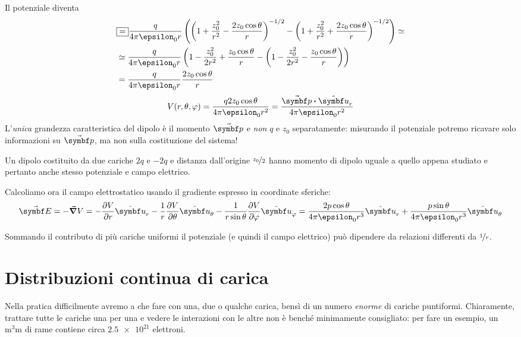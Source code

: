 Il potenziale diventa
\begin{align*}
	&\squarequal\frac{q}{4\pi\epsilon_0r}\left(\left(1+\frac{z_0^2}{r^2}-\frac{2z_0\cos\theta}{r}\right)^{-1/2}-\left(1+\frac{z_0^2}{r^2}+\frac{2z_0\cos\theta}{r}\right)^{-1/2}\right)\simeq\\
	&\simeq\frac{q}{4\pi\epsilon_0r}\left(1-\frac{z_0^2}{2r^2}+\frac{z_0\cos\theta}{r}-\left(1-\frac{z_0^2}{2r^2}-\frac{z_0\cos\theta}{r}\right)\right)\\
	&=\frac{q}{4\pi\epsilon_0r}\frac{2z_0\cos\theta}{r}
\end{align*}
\begin{equation}
	V(r,\theta,\phi)=\frac{q2z_0\cos\theta}{4\pi\epsilon_0r^2}=\frac{\vba{p}\vdot\vbh{u}_r}{4\pi\epsilon_0r^2}
\end{equation}
L'\textit{unica} grandezza caratteristica del dipolo è il momento $\vba{p}$ e \textit{non} $q$ e $z_0$ separatamente: misurando il potenziale potremo ricavare solo informazioni su $\vba{p}$, ma non sulla costituzione del sistema!
\begin{example}
	Un dipolo costituito da due cariche $2q$ e $-2q$ e distanza dall'origine $\nicefrac{z_0}{2}$ hanno momento di dipolo uguale a quello appena studiato e pertanto anche stesso potenziale e campo elettrico.
\end{example}
Calcoliamo ora il campo elettrostatico usando il gradiente espresso in coordinate sferiche:
\begin{equation}
	\vba{E}=-\grad{V}=-\pdv{V}{r}\vbh{u}_r-\frac{1}{r}\pdv{V}{\theta}\vbh{u}_\theta-\frac{1}{r\sin\theta}\pdv{V}{\phi}\vbh{u}_\phi=\frac{2p\cos\theta}{4\pi\epsilon_0r^3}\vbh{u}_r+\frac{p\sin\theta}{4\pi\epsilon_0r^3}\vbh{u}_\theta
\end{equation}
\begin{observe}
	Sommando il contributo di più cariche uniformi il potenziale (e quindi il campo elettrico) può dipendere da relazioni differenti da $\nicefrac{1}{r}$.
\end{observe}
\section{Distribuzioni continua di carica}
Nella pratica difficilmente avremo a che fare con una, due o qualche carica, bensì di un numero \textit{enorme} di cariche puntiformi. Chiaramente, trattare tutte le cariche una per una e vedere le interazioni con le altre non è benché minimamente consigliato: per fare un esempio, un $\unit{\cubic\milli\metre}$ di rame contiene circa $\num[exponent-product = \ensuremath{\cdot}]{2,5e21}$ elettroni.

